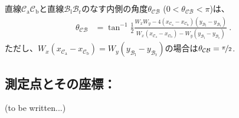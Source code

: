 直線$\mathcal C_\mathrm a\mathcal C_\mathrm b$と直線$\mathcal B_\mathrm l\mathcal B_\mathrm r$のなす内側の角度$\theta_{\mathcal{CB}}$ ($0 < \theta_{\mathcal{CB}} < \pi$)は、
\begin{align*}
  \theta_{\mathcal{CB}}
  &= \tan^{-1}
     \frac12
     \frac{W_xW_y
           -4\left(x_{\mathcal C_\mathrm a}-x_{\mathcal C_\mathrm b}\right)
             \left(y_{\mathcal B_\mathrm l}-y_{\mathcal B_\mathrm r}\right)}
          {W_x\left(x_{\mathcal C_\mathrm a}-x_{\mathcal C_\mathrm b}\right)
           -W_y\left(y_{\mathcal B_\mathrm l}-y_{\mathcal B_\mathrm r}\right)}\ .
\end{align*}
ただし、$W_x\left(x_{\mathcal C_\mathrm a}-x_{\mathcal C_\mathrm b}\right) = W_y\left(y_{\mathcal B_\mathrm l}-y_{\mathcal B_\mathrm r}\right)$の場合は$\theta_{\mathcal{CB}} = \nicefrac\pi2$.



\subsection{測定点とその座標：\EndFaceInChamfer\TBW}
(to be written...)
